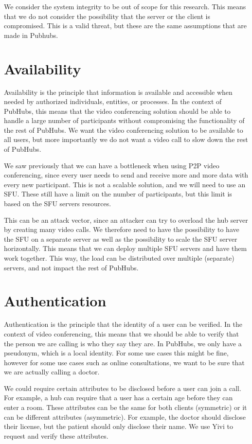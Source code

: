 \documentclass{report}
\begin{document}
We consider the system integrity to be out of scope for this research. This means that we do not consider the
possibility that the server or the client is compromised. This is a valid threat, but these are the same assumptions
that are made in Pubhubs.

\section{Availability}
Availability is the principle that information is available and accessible when needed by authorized individuals,
entities, or processes. In the context of PubHubs, this means that the video conferencing solution should be able to
handle a large number of participants without compromising the functionality of the rest of PubHubs. We want the
video conferencing solution to be available to all users, but more importantly we do not want a video call to slow
down the rest of PubHubs.

We saw previously that we can have a bottleneck when using P2P video conferencing, since every user needs to send
and receive more and more data with every new participant. This is not a scalable solution, and we will need to use
an SFU. These still have a limit on the number of participants, but this limit is based on the SFU servers resources.

This can be an attack vector, since an attacker can try to overload the hub server by creating many video calls. We
therefore need to have the possibility to have the SFU on a separate server as well as the possibility to scale the SFU
server horizontally. This means that we can deploy multiple SFU servers and have them work together.
This way, the load can be distributed over multiple (separate) servers, and not impact the rest of PubHubs.

\section{Authentication}
Authentication is the principle that the identity of a user can be verified. In the context of video conferencing,
this means that we should be able to verify that the person we are calling is who they say they are. In PubHubs, we
only have a pseudonym, which is a local identity. For some use cases this might be fine, however for some use cases
such as online consultations, we want to be sure that we are actually calling a doctor.

We could require certain attributes to be disclosed before a user can join a call. For example, a hub
can require that a user has a certain age before they can enter a room. These attributes can be the same for both
clients (symmetric) or it can be different attributes (asymmetric). For example, the doctor should disclose their license, but the patient should only
disclose their name. We use Yivi to request and verify these attributes.
\end{document}

